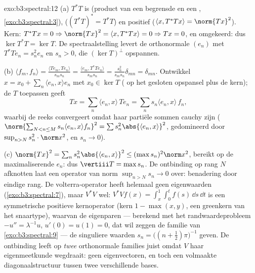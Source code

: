\begin{solution}{exo:b3:spectral:12}
(a) $T^*T$ is  (product van een begrensde en een , \cref{exo:b3:spectral:3}),  ($(T^*T)^* =
T^*T$) en positief ($\langle x, T^*Tx\rangle = \norm{Tx}^2$).
Kern: $T^*Tx = 0 \Rightarrow \norm{Tx}^2 = \langle x,
T^*Tx\rangle = 0 \Rightarrow Tx = 0$, en omgekeerd: dus $\ker
T^*T = \ker T$. De spectraalstelling levert de orthonormale
$(e_n)$ met $T^*Te_n = s_n^2e_n$ en $s_n > 0$, die $(\ker
T)^\perp$ opspannen.

(b) $\langle f_m, f_n\rangle = \frac{\langle Te_m,
Te_n\rangle}{s_ms_n} = \frac{\langle e_m,
T^*Te_n\rangle}{s_ms_n} = \frac{s_n^2}{s_ms_n}\delta_{mn} =
\delta_{mn}$. Ontwikkel $x = x_0 + \sum_n\langle e_n, x\rangle
e_n$ met $x_0 \in \ker T$ ( op het gesloten opspansel
plus de kern); de  $T$ toepassen geeft
\[
Tx = \sum_n\langle e_n, x\rangle\,Te_n =
\sum_ns_n\langle e_n, x\rangle\,f_n,
\]
waarbij de reeks convergeert omdat haar partiële sommen cauchy
zijn ($\norm{\sum_{N<n\leq M}s_n\langle e_n, x\rangle f_n}^2 =
\sum s_n^2\abs{\langle e_n, x\rangle}^2$, gedomineerd door
$\sup_{n>N}s_n^2\cdot\norm x^2$, en $s_n \to 0$).

(c) $\norm{Tx}^2 = \sum_ns_n^2\abs{\langle e_n, x\rangle}^2 \leq
(\max s_n)^2\norm x^2$, bereikt op de maximaliserende $e_n$: dus
$\vertiii T = \max s_n$. De ontbinding op rang $N$ afknotten laat
een operator van norm $\sup_{n>N}s_n \to 0$ over: benadering door
eindige rang. De volterra-operator heeft helemaal geen
eigenwaarden (\cref{exo:b3:spectral:7}), maar $V^*V$ wel:
$V^*Vf(x) = \int_x^1\int_0^tf(s)\,\dd s\,\dd t$ is een
symmetrische positieve kernoperator (kern $1 - \max(x,y)$, een
greenkern van het snaartype), waarvan de eigenparen --- berekend
met het randwaardeprobleem $-u'' = \lambda^{-1}u$, $u'(0) = u(1)
= 0$, dat wil zeggen de familie van \cref{exo:b3:spectral:9} ---
de singuliere waarden $s_n = \bigl((n + \frac12)\pi\bigr)^{-1}$
geven. De ontbinding leeft op \emph{twee} orthonormale families
juist omdat $V$ haar eigenmeetkunde wegdraait: geen
eigenvectoren, en toch een volmaakte diagonaalstructuur tussen
twee verschillende bases.
\end{solution}

